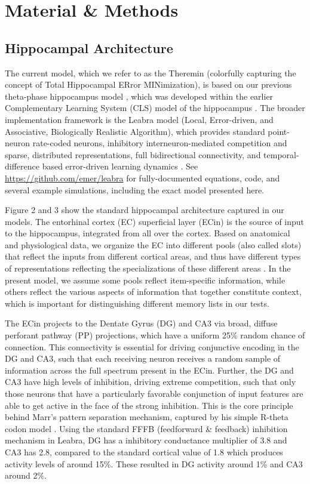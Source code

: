 \documentclass[11pt,twoside]{article}
\newif\myifpdf
\begin{document}
\section{Material & Methods}

\subsection{Hippocampal Architecture}

The current model, which we refer to as the Theremin (colorfully capturing the concept of Total Hippocampal ERror MINimization), is based on our previous theta-phase hippocampus model \citep{KetzMorkondaOReilly13}, which was developed within the earlier Complementary Learning System (CLS) model of the hippocampus \citep{NormanOReilly03,OReillyRudy01}.  The broader implementation framework is the Leabra model (Local, Error-driven, and Associative, Biologically Realistic Algorithm), which provides standard point-neuron rate-coded neurons, inhibitory interneuron-mediated competition and sparse, distributed representations, full bidirectional connectivity, and temporal-difference based error-driven learning dynamics \citep{OReillyMunakata00,OReillyMunakataFrankEtAl12}.  See \url{https://github.com/emer/leabra} for fully-documented equations, code, and several example simulations, including the exact model presented here.

Figure 2 and 3 show the standard hippocampal architecture captured in our models. The entorhinal cortex (EC) superficial layer (ECin) is the source of input to the hippocampus, integrated from all over the cortex.  Based on anatomical and physiological data, we organize the EC into different pools (also called slots) that reflect the inputs from different cortical areas, and thus have different types of representations reflecting the specializations of these different areas \citep{WitterDoanJacobsenEtAl17}.  In the present model, we assume some pools reflect item-specific information, while others reflect the various aspects of information that together constitute context, which is important for distinguishing different memory lists in our tests.

The ECin projects to the Dentate Gyrus (DG) and CA3 via broad, diffuse perforant pathway (PP) projections, which have a uniform 25\% random chance of connection.  This connectivity is essential for driving conjunctive encoding in the DG and CA3, such that each receiving neuron receives a random sample of information across the full spectrum present in the ECin.  Further, the DG and CA3 have high levels of inhibition, driving extreme competition, such that only those neurons that have a particularly favorable conjunction of input features are able to get active in the face of the strong inhibition.  This is the core principle behind Marr's pattern separation mechanism, captured by his simple R-theta codon model \citep{Marr71}.  Using the standard FFFB (feedforward \& feedback) inhibition mechanism in Leabra, DG has a inhibitory conductance multiplier of 3.8 and CA3 has 2.8, compared to the standard cortical value of 1.8 which produces activity levels of around 15\%.  These resulted in DG activity around 1\% and CA3 around 2\%.
\end{document}
